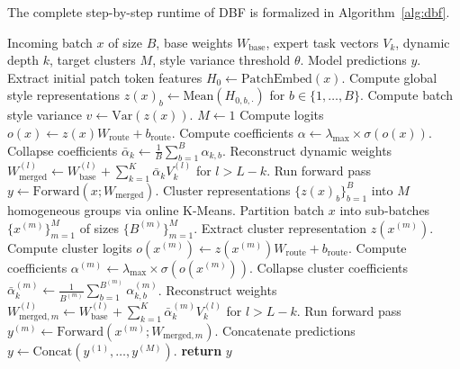 The complete step-by-step runtime of DBF is formalized in Algorithm~\ref{alg:dbf}.

\begin{algorithm}[tb]
\caption{Dynamic Batch Filtering (DBF) Inference Loop}
\label{alg:dbf}
\begin{algorithmic}[1]
 Incoming batch $x$ of size $B$, base weights $W_{\text{base}}$, expert task vectors $V_k$, dynamic depth $k$, target clusters $M$, style variance threshold $\theta$.
 Model predictions $y$.
\STATE Extract initial patch token features $H_0 \gets \text{PatchEmbed}(x)$.
\STATE Compute global style representations $z(x)_b \gets \text{Mean}(H_{0, b, \cdot})$ for $b \in \{1, \dots, B\}$.
\STATE Compute batch style variance $v \gets \text{Var}(z(x))$.
    \STATE $M \gets 1$ 
\ENDIF
{}
    \STATE Compute logits $o(x) \gets z(x) W_{\text{route}} + b_{\text{route}}$.
    \STATE Compute coefficients $\alpha \gets \lambda_{\text{max}} \times \sigma(o(x))$.
    \STATE Collapse coefficients $\bar{\alpha}_k \gets \frac{1}{B} \sum_{b=1}^B \alpha_{k, b}$.
    \STATE Reconstruct dynamic weights $W_{\text{merged}}^{(l)} \gets W_{\text{base}}^{(l)} + \sum_{k=1}^K \bar{\alpha}_k V_k^{(l)}$ for $l > L-k$.
    \STATE Run forward pass $y \gets \text{Forward}(x; W_{\text{merged}})$.
\ELSE
    \STATE Cluster representations $\{z(x)_b\}_{b=1}^B$ into $M$ homogeneous groups via online K-Means.
    \STATE Partition batch $x$ into sub-batches $\{x^{(m)}\}_{m=1}^M$ of sizes $\{B^{(m)}\}_{m=1}^M$.
        \STATE Extract cluster representation $z(x^{(m)})$.
        \STATE Compute cluster logits $o(x^{(m)}) \gets z(x^{(m)}) W_{\text{route}} + b_{\text{route}}$.
        \STATE Compute coefficients $\alpha^{(m)} \gets \lambda_{\text{max}} \times \sigma(o(x^{(m)}))$.
        \STATE Collapse cluster coefficients $\bar{\alpha}_k^{(m)} \gets \frac{1}{B^{(m)}} \sum_{b=1}^{B^{(m)}} \alpha_{k, b}^{(m)}$.
        \STATE Reconstruct weights $W_{\text{merged}, m}^{(l)} \gets W_{\text{base}}^{(l)} + \sum_{k=1}^K \bar{\alpha}_k^{(m)} V_k^{(l)}$ for $l > L-k$.
        \STATE Run forward pass $y^{(m)} \gets \text{Forward}(x^{(m)}; W_{\text{merged}, m})$.
    \ENDFOR
    \STATE Concatenate predictions $y \gets \text{Concat}(y^{(1)}, \dots, y^{(M)})$.
\ENDIF
\STATE \textbf{return} $y$
\end{algorithmic}
\end{algorithm}

